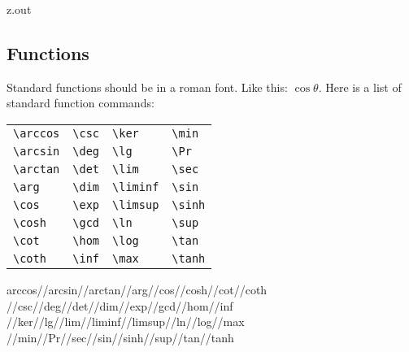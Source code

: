 \begin{VerbatimOut}{z.out}

\subsection{Functions}

Standard functions should be in a roman font.
Like this: \(\cos\theta\).
Here is a list of standard function commands:\\

\begin{tabular}{@{\hspace*{\parindent}}llll@{}}
  \verb+\arccos+& \verb+\csc+& \verb+\ker+&    \verb+\min+\\
  \verb+\arcsin+& \verb+\deg+& \verb+\lg+&     \verb+\Pr+\\
  \verb+\arctan+& \verb+\det+& \verb+\lim+&    \verb+\sec+\\
  \verb+\arg+&    \verb+\dim+& \verb+\liminf+& \verb+\sin+\\
  \verb+\cos+&    \verb+\exp+& \verb+\limsup+& \verb+\sinh+\\
  \verb+\cosh+&   \verb+\gcd+& \verb+\ln+&     \verb+\sup+\\
  \verb+\cot+&    \verb+\hom+& \verb+\log+&    \verb+\tan+\\
  \verb+\coth+&   \verb+\inf+& \verb+\max+&    \verb+\tanh+\\
\end{tabular}
\ix
{%
  arccos//arcsin//arctan//arg//cos//cosh//cot//coth%
  //csc//deg//det//dim//exp//gcd//hom//inf%
  //ker//lg//lim//liminf//limsup//ln//log//max%
  //min//Pr//sec//sin//sinh//sup//tan//tanh%
}
\index{\verb+\arccos+} \index{\verb+\arcsin+} \index{\verb+\arctan+} \index{\verb+\arg+}
\index{\verb+\cos+} \index{\verb+\cosh+} \index{\verb+\cot+} \index{\verb+\coth+}
\index{\verb+\csc+} \index{\verb+\deg+} \index{\verb+\det+} \index{\verb+\dim+}
\index{\verb+\exp+} \index{\verb+\gcd+} \index{\verb+\hom+} \index{\verb+\inf+}
\index{\verb+\ker+} \index{\verb+\lg+} \index{\verb+\lim+} \index{\verb+\liminf+}
\index{\verb+\limsup+} \index{\verb+\ln+} \index{\verb+\log+} \index{\verb+\max+}
\index{\verb+\min+} \index{\verb+\Pr+} \index{\verb+\sec+} \index{\verb+\sin+}
\index{\verb+\sinh+} \index{\verb+\sup+} \index{\verb+\tan+} \index{\verb+\tanh+}
\end{VerbatimOut}

